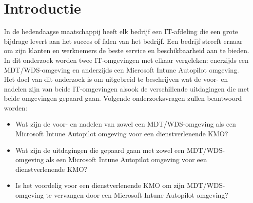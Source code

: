 
\section{Introductie} %
\label{sec:introductie}

In de hedendaagse maatschappij heeft elk bedrijf een IT-afdeling die een grote bijdrage levert aan het succes of falen van het bedrijf. Een bedrijf streeft ernaar om zijn klanten en werknemers de beste service en beschikbaarheid aan te bieden. In dit onderzoek worden twee IT-omgevingen met elkaar vergeleken: enerzijds een MDT/WDS-omgeving en anderzijds een Microsoft Intune Autopilot omgeving. 
\newline
Het doel van dit onderzoek is om uitgebreid te beschrijven wat de voor- en nadelen zijn van beide IT-omgevingen alsook de verschillende uitdagingen die met beide omgevingen gepaard gaan. Volgende onderzoeksvragen zullen beantwoord worden:

\begin{itemize}
    \item Wat zijn de voor- en nadelen van zowel een MDT/WDS-omgeving als een Microsoft Intune Autopilot omgeving voor een dienstverlenende KMO?
    \item Wat zijn de uitdagingen die gepaard gaan met zowel een MDT/WDS-omgeving als een Microsoft Intune Autopilot omgeving voor een dienstverlenende KMO?
    \item Is het voordelig voor een dienstverlenende KMO om zijn MDT/WDS-omgeving te vervangen door een Microsoft Intune Autopilot omgeving?
\end{itemize}






